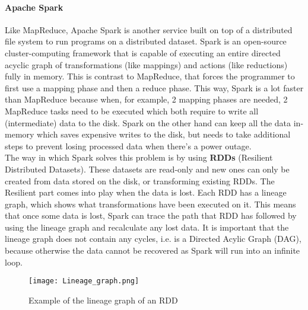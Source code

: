 \paragraph{Apache Spark}
Like MapReduce, Apache Spark is another service built on top of a distributed file system to run programs on a distributed dataset. Spark is an open-source cluster-computing framework that is capable of executing an entire directed acyclic graph of transformations (like mappings) and actions (like reductions) fully in memory\cite{Sparkwebsite}. This is contrast to MapReduce, that forces the programmer to first use a mapping phase and then a reduce phase. This way, Spark is a lot faster than MapReduce because when, for example, 2 mapping phases are needed, 2 MapReduce tasks need to be executed which both require to write all (intermediate) data to the disk. Spark on the other hand can keep all the data in-memory which saves expensive writes to the disk, but needs to take additional steps to prevent losing processed data when there's a power outage.\\

The way in which Spark solves this problem is by using \textbf{RDDs} (Resilient Distributed Datasets). These datasets are read-only and new ones can only be created from data stored on the disk, or transforming existing RDDs\cite{Zaha12}. The Resilient part comes into play when the data is lost. Each RDD has a lineage graph, which shows what transformations have been executed on it. This means that once some data is lost, Spark can trace the path that RDD has followed by using the lineage graph and recalculate any lost data. It is important that the lineage graph does not contain any cycles, i.e. is a Directed Acylic Graph (DAG), because otherwise the data cannot be recovered as Spark will run into an infinite loop.

\begin{figure}
  \begin{center}
    \texttt{[image: Lineage\_graph.png]}
  \end{center}
  \caption{Example of the lineage graph of an RDD\cite{Zaha12}}
  \label{lineagegraph}
\end{figure}